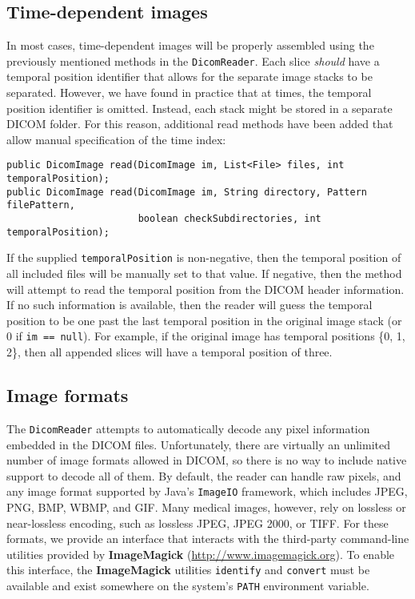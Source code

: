 \subsection{Time-dependent images}

In most cases, time-dependent images will be properly assembled using the previously mentioned
methods in the \lstinline{DicomReader}.  Each slice \emph{should} have a temporal position
identifier that allows for the separate image stacks to be separated.  However, we have found
in practice that at times, the temporal position identifier is omitted.  Instead, each stack
might be stored in a separate DICOM folder.  For this reason, additional read methods have
been added that allow manual specification of the time index:
\begin{lstlisting}[]
public DicomImage read(DicomImage im, List<File> files, int temporalPosition);
public DicomImage read(DicomImage im, String directory, Pattern filePattern, 
                       boolean checkSubdirectories, int temporalPosition);
\end{lstlisting}
If the supplied \lstinline{temporalPosition} is non-negative, then the temporal
position of all included files will be manually set to that value.  If negative,
then the method will attempt to read the temporal position from the DICOM header
information.  If no such information is available, then the reader will guess the 
temporal position to be one past the last temporal position in the original image
stack (or 0 if \lstinline{im == null}).  For example, if the original
image has temporal positions \{0, 1, 2\}, then all appended slices will have
a temporal position of three.

\subsection{Image formats \label{sec:dicom:formats}}

The \lstinline{DicomReader} attempts to automatically decode any pixel information 
embedded in the DICOM files.  Unfortunately, there are virtually an unlimited number
of image formats allowed in DICOM, so there is no way to include native
support to decode all of them.  By default, the reader can handle raw pixels,
and any image format supported by Java's \lstinline{ImageIO} framework,
which includes JPEG, PNG, BMP, WBMP, and GIF.  Many medical images, however,
rely on lossless or near-lossless encoding, such as lossless JPEG, JPEG 2000, or TIFF.
For these formats, we provide an interface that interacts with the third-party
command-line utilities provided by \textbf{ImageMagick} (\url{http://www.imagemagick.org}).
To enable this interface, the \textbf{ImageMagick} utilities \texttt{identify} and 
\texttt{convert} must be available and exist somewhere on the system's \texttt{PATH}
environment variable.

